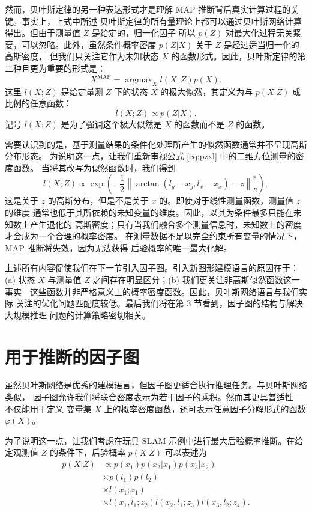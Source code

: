 \documentclass[fontset=none]{Notes}
\DeclareMathOperator*\argmax{argmax}
\newcommand{\norm}[1]{\left\lVert#1\right\rVert}
\begin{document}
然而，贝叶斯定律的另一种表达形式才是理解 MAP 推断背后真实计算过程的关键。事实上，上式中所述
贝叶斯定律的所有量理论上都可以通过贝叶斯网络计算得出。但由于测量值 $Z$ 是给定的，归一化因子
所以 $p(Z)$ 对最大化过程无关紧要，可以忽略。此外，虽然条件概率密度 $p(Z|X)$ 关于 $Z$ 是经过适当归一化的高斯密度，
但我们只关注它作为未知状态 $X$ 的函数形式。因此，贝叶斯定律的第二种且更为重要的形式是：
\[
  X^{\mathrm{MAP}}=\argmax_X l(X;Z) p(X).
\]
这里 $l(X;Z)$ 是给定量测 $Z$ 下的状态 $X$ 的极大似然，其定义为与 $p(X|Z)$ 
成比例的任意函数：
\[
  l(X;Z)\varpropto  p(Z|X).
\]
记号 $l(X;Z)$ 是为了强调这个极大似然是 $X$ 的函数而不是 $Z$ 的函数。

需要认识到的是，基于测量结果的条件化处理所产生的似然函数通常并不呈现高斯分布形态。
为说明这一点，让我们重新审视公式 \eqref{eq:pzxl} 中的二维方位测量的密度函数。
当将其改写为似然函数时，我们得到
\[
  l(X;Z)\varpropto \exp\left(
    -\frac{1}{2}\norm{\arctan(l_y-x_y,l_x-x_x)-z}_R^2
  \right),
\]
这是关于 $z$ 的高斯分布，但是不是关于 $x$ 的。即使对于线性测量函数，测量值 $z$ 的维度
通常也低于其所依赖的未知变量的维度。因此，以其为条件最多只能在未知数上产生退化的
高斯密度；只有当我们融合多个测量信息时，未知数上的密度才会成为一个合理的概率密度。
在测量数据不足以完全约束所有变量的情况下，MAP 推断将失效，因为无法获得
后验概率的唯一最大化解。

上述所有内容促使我们在下一节引入因子图。引入新图形建模语言的原因在于：(a) 状态
$X$ 与测量值 $Z$ 之间存在明显区分；(b) 我们更关注非高斯似然函数这一
事实---这些函数并非严格意义上的概率密度函数。因此，贝叶斯网络语言与我们实际
关注的优化问题匹配度较低。最后我们将在第 3 节看到，因子图的结构与解决大规模推理
问题的计算策略密切相关。

\section{用于推断的因子图}

虽然贝叶斯网络是优秀的建模语言，但因子图更适合执行推理任务。与贝叶斯网络类似，
因子图允许我们将联合密度表示为若干因子的乘积。然而其更具普适性---不仅能用于定义
变量集 $X$ 上的概率密度函数，还可表示任意因子分解形式的函数 $\varphi(X)$。

为了说明这一点，让我们考虑在玩具 SLAM 示例中进行最大后验概率推断。在给定观测值 
$Z$ 的条件下，后验概率 $p(X|Z)$ 可以表述为
\begin{align}
  p(X|Z)&\varpropto p(x_1)p(x_2|x_1)p(x_3|x_2)\label{eq:markov of pose 1}\\
  &\times p(l_1)p(l_2) \label{eq:density of landmarks 1}\\
  &\times l(x_1;z_1) \label{eq:meas on x1 1}\\
  &\times l(x_1,l_1;z_2)l(x_2,l_1;z_3)l(x_3,l_2;z_4). \label{eq:meas on x 1}
\end{align}
\end{document}
